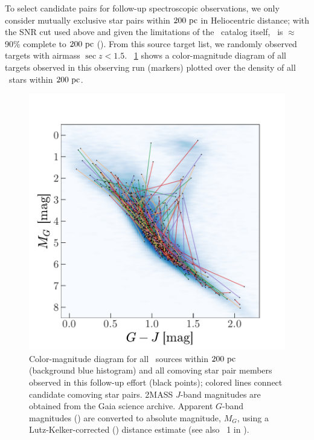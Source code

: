 \documentclass[modern, letterpaper]{aastex61}
\newcommand{\tgas}{\acronym{TGAS}}
\begin{document}
To select candidate pairs for follow-up spectroscopic observations, we only
consider mutually exclusive star pairs within $200~\mathrm{pc}$ in Heliocentric
distance; with the SNR cut used above and given the limitations of the \tgas\
catalog itself, \tgas\ is $\approx$90\% complete to $200~\mathrm{pc}$
(\citealt{Bovy:2017}).
From this source target list, we randomly observed targets with airmass $\sec z
< 1.5$.
\figurename~\ref{fig:sample-cmd} shows a color-magnitude diagram of all targets
observed in this observing run (markers) plotted over the density of all \tgas\
stars within $200~\mathrm{pc}$.

\begin{figure}[htbp]
  \begin{center}
    \includegraphics[width=\linewidth]{sample_cmd.pdf}
  \end{center}
  \caption{%
    Color-magnitude diagram for all \tgas\ sources within $200~\mathrm{pc}$ (background
    blue histogram) and all comoving star pair members observed in this
    follow-up effort (black points); colored lines connect candidate comoving
    star pairs.
    2MASS $J$-band magnitudes are obtained from the Gaia science
    archive.
    Apparent $G$-band magnitudes (\citealt{Carrasco:2016}) are converted to
    absolute magnitude, $M_G$, using a Lutz-Kelker-corrected
    (\citealt{Lutz:1973}) distance estimate (see also \eqname~1 in
    \citealt{Oh:2017}).
    \label{fig:sample-cmd}}
\end{figure}
\end{document}
